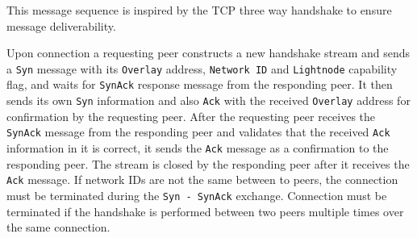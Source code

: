 




This message sequence is inspired by the TCP three way handshake to ensure message deliverability.

Upon connection a requesting peer constructs a new handshake stream and sends a \lstinline{Syn} message with its \lstinline{Overlay} address, \lstinline{Network ID} and \lstinline{Lightnode} capability flag, and waits for \lstinline{SynAck} response message from the responding peer. It then
sends its own \texttt{Syn} information and also \texttt{Ack} with the
received \texttt{Overlay} address for confirmation by the requesting
peer. After the requesting peer receives the \texttt{SynAck} message
from the responding peer and validates that the received \texttt{Ack}
information in it is correct, it sends the \texttt{Ack} message as a
confirmation to the responding peer. The stream is closed by the
responding peer after it receives the \texttt{Ack} message. If network
IDs are not the same between to peers, the connection must be terminated
during the \texttt{Syn\ -\ SynAck} exchange. Connection must be
terminated if the handshake is performed between two peers multiple
times over the same connection.




